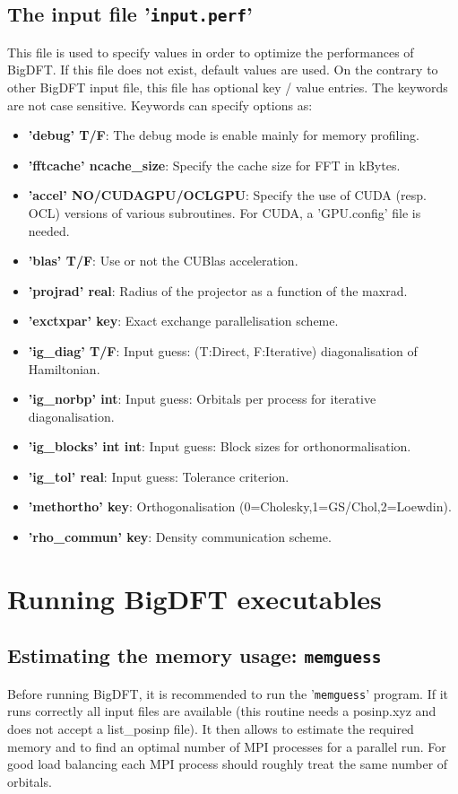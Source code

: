 \documentclass[a4paper,11pt]{report}
\begin{document}
\section{The input file '\texttt{input.perf}'}
This file is used to specify values in order to optimize the performances of BigDFT. If this file
does not exist, default values are used. On the contrary to other BigDFT input file, this file has optional key / value entries. The keywords are not case sensitive. Keywords can specify options as:
\begin{itemize}
  \item  \textbf{'debug' T/F}: The debug mode is enable mainly for memory profiling.
  \item  \textbf{'fftcache' ncache\_size}: Specify the cache size for FFT in kBytes.
  \item  \textbf{'accel' NO/CUDAGPU/OCLGPU}: Specify the use of CUDA (resp. OCL) versions of various subroutines. For CUDA, a 'GPU.config' file is needed.
  \item  \textbf{'blas' T/F}: Use or not the CUBlas acceleration.
  \item  \textbf{'projrad' real}: Radius of the projector as a function of the maxrad.
  \item  \textbf{'exctxpar' key}: Exact exchange parallelisation scheme.
  \item  \textbf{'ig\_diag' T/F}: Input guess: (T:Direct, F:Iterative) diagonalisation of Hamiltonian.
  \item  \textbf{'ig\_norbp' int}: Input guess: Orbitals per process for iterative diagonalisation.
  \item  \textbf{'ig\_blocks' int int}: Input guess: Block sizes for orthonormalisation.
  \item  \textbf{'ig\_tol' real}: Input guess: Tolerance criterion.
  \item  \textbf{'methortho' key}: Orthogonalisation (0=Cholesky,1=GS/Chol,2=Loewdin).
  \item  \textbf{'rho\_commun' key}: Density communication scheme.
\end{itemize}

\chapter{ Running BigDFT executables}

\section{Estimating the memory usage: \texttt{memguess}}
Before running BigDFT, it is recommended to run the '\texttt{memguess}' program. If it runs correctly all input files are available 
(this routine needs a posinp.xyz and does not accept a list\_posinp file). It then allows to estimate the required memory and to 
find an optimal number of MPI processes for a parallel run. For good load balancing each MPI process should roughly treat the same number of orbitals.
\end{document}
